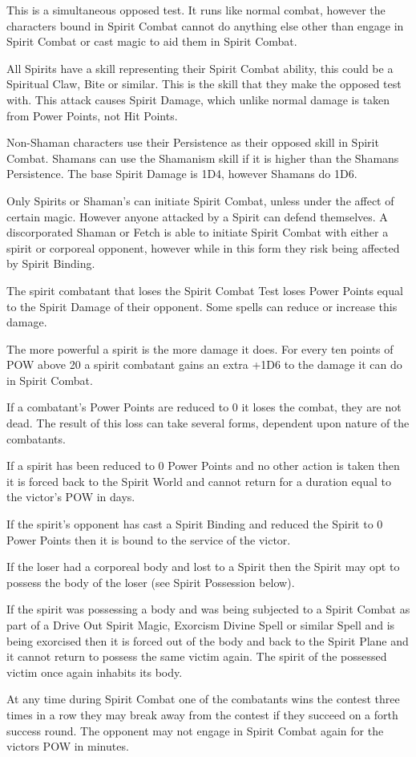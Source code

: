 \begin{rpg-list}
\item This is a simultaneous opposed test. It runs like normal combat, however the characters bound in Spirit Combat cannot do anything else other than engage in Spirit Combat or cast magic to aid them in Spirit Combat. 
\item All Spirits have a skill representing their Spirit Combat ability, this could be a Spiritual Claw, Bite or similar. This is the skill that they make the opposed test with. This attack causes Spirit Damage, which unlike normal damage is taken from Power Points, not Hit Points.
\item Non-Shaman characters use their Persistence as their opposed skill in Spirit Combat. Shamans can use the Shamanism skill if it is higher than the Shamans Persistence. The base Spirit Damage is 1D4, however Shamans do 1D6.
\item Only Spirits or Shaman’s can initiate Spirit Combat, unless under the affect of certain magic. However anyone attacked by a Spirit can defend themselves. A discorporated Shaman or Fetch is able to initiate Spirit Combat with either a spirit or corporeal opponent, however while in this form they risk being affected by Spirit Binding.
\item The spirit combatant that loses the Spirit Combat Test loses Power Points equal to the Spirit Damage of their opponent. Some spells can reduce or increase this damage.
\item The more powerful a spirit is the more damage it does. For every ten points of POW above 20 a spirit combatant gains an extra +1D6 to the damage it can do in Spirit Combat.
\item If a combatant’s Power Points are reduced to 0 it loses the combat, they are not dead. The result of this loss can take several forms, dependent upon nature of the combatants.
\item If a spirit has been reduced to 0 Power Points and no other action is taken then it is forced back to the Spirit World and cannot return for a duration equal to the victor’s POW in days.
\item If the spirit’s opponent has cast a Spirit Binding and reduced the Spirit to 0 Power Points then it is bound to the service of the victor. 
\item If the loser had a corporeal body and lost to a Spirit then the Spirit may opt to possess the body of the loser (see Spirit Possession below).
\item If the spirit was possessing a body and was being subjected to a Spirit Combat as part of a Drive Out Spirit Magic, Exorcism Divine Spell or similar Spell and is being exorcised then it is forced out of the body and back to the Spirit Plane and it cannot return to possess the same victim again. The spirit of the possessed victim once again inhabits its body.
\item At any time during Spirit Combat one of the combatants wins the contest three times in a row they may break away from the contest if they succeed on a forth success round. The opponent may not engage in Spirit Combat again for the victors POW in minutes.
\end{rpg-list}


